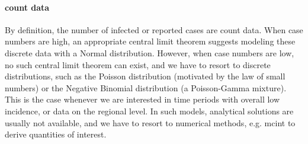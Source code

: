 \paragraph{count data}
By definition, the number of infected or reported cases are count data. When case numbers are high, an appropriate central limit theorem suggests modeling these discrete data with a Normal distribution. However, when case numbers are low, no such central limit theorem can exist, and we have to resort to discrete distributions, such as the Poisson distribution (motivated by the law of small numbers) or the Negative Binomial distribution (a Poisson-Gamma mixture). This is the case whenever we are interested in time periods with overall low incidence, or data on the regional level.
In such models, analytical solutions are usually not available, and we have to resort to numerical methods, e.g. \acrshort{mcint} to derive quantities of interest.